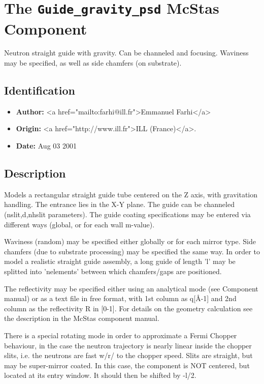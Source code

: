 \section{The \texttt{Guide\_gravity\_psd} McStas Component}
Neutron straight guide with gravity. Can be channeled and focusing.
Waviness may be specified, as well as side chamfers (on substrate).

\subsection*{Identification}
\begin{itemize}
  \item \textbf{Author:} \textless{}a href="mailto:farhi@ill.fr"\textgreater{}Emmanuel Farhi\textless{}/a\textgreater{}
  \item \textbf{Origin:} \textless{}a href="http://www.ill.fr"\textgreater{}ILL (France)\textless{}/a\textgreater{}.
  \item \textbf{Date:} Aug 03 2001
\end{itemize}

\subsection*{Description}
Models a rectangular straight guide tube centered on the Z axis, with gravitation handling. The entrance lies in the X-Y plane. The guide can be channeled (nslit,d,nhslit parameters). The guide coating specifications may be entered via different ways (global, or for each wall m-value).

Waviness (random) may be specified either globally or for each mirror type. Side chamfers (due to substrate processing) may be specified the same way. In order to model a realistic straight guide assembly, a long guide of length 'l' may be splitted into 'nelements' between which chamfers/gaps are positioned.

The reflectivity may be specified either using an analytical mode (see Component manual) or as a text file in free format, with 1st column as q[\AA{}-1] and 2nd column as the reflectivity R in [0-1]. For details on the geometry calculation see the description in the McStas component manual.

There is a special rotating mode in order to approximate a Fermi Chopper behaviour, in the case the neutron trajectory is nearly linear inside the chopper slits, i.e. the neutrons are fast w/r/ to the chopper speed. Slits are straight, but may be super-mirror coated. In this case, the component is NOT centered, but located at its entry window. It should then be shifted by -l/2.

